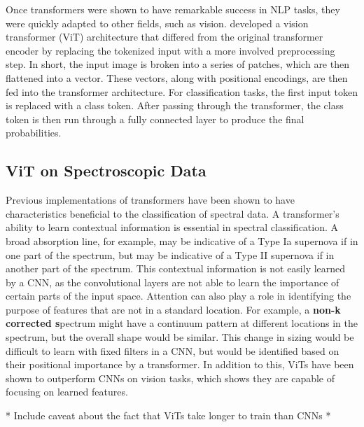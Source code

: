 Once transformers were shown to have remarkable success in NLP tasks, they were 
quickly adapted to other fields, such as vision. \textcite{dosovitskiy2020} developed 
a vision transformer (ViT) architecture that differed from the original transformer 
encoder by replacing the tokenized input with a more involved preprocessing step. In short, 
the input image is broken into a series of patches, which are then flattened into
a vector. These vectors, along with positional encodings, are then fed into the
transformer architecture. For classification tasks, the first input token is 
replaced with a class token. After passing through the transformer, the class token 
is then run through a fully connected layer to produce the final probabilities. 

\subsection{ViT on Spectroscopic Data}\label{sec:ViT}
Previous implementations of transformers have been shown to have characteristics 
beneficial to the classification of spectral data. A transformer's 
ability to learn contextual information is essential in spectral classification. 
A broad absorption line, for example, may be indicative of a Type Ia supernova 
if in one part of the spectrum, but may be indicative of a Type II supernova if
in another part of the spectrum. This contextual information is not easily learned 
by a CNN, as the convolutional layers are not able to learn the importance of
certain parts of the input space. Attention can also play a role in identifying 
the purpose of features that are not in a standard location. For example, a 
\textbf{non-k corrected s}pectrum might have a continuum pattern at different locations 
in the spectrum, but the overall shape would be similar. This change in sizing 
would be difficult to learn with fixed filters in a CNN, but would be identified 
based on their positional importance by a transformer. In addition to this, ViTs 
have been shown to outperform CNNs on vision tasks, which shows they are capable 
of focusing on learned features. 


* Include caveat about the fact that ViTs take longer to train than CNNs *

